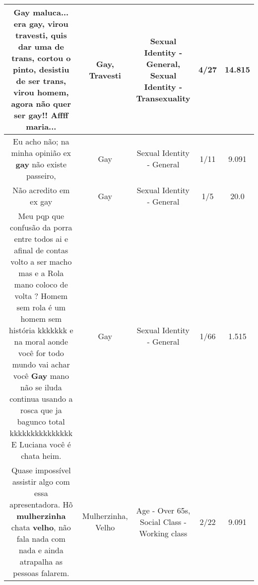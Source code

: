 \documentclass[11pt]{article}
\newlength\mylength
\begin{document}
\begin{center}
\begin{longtable}{|C{.65\mylength}|C{.30\mylength}|C{.12\mylength}|C{.12\mylength}|C{.12\mylength}|}
  \small Gay maluca... era \textbf{gay}, virou \textbf{travesti}, quis dar uma de trans, cortou o pinto, desistiu de ser trans, virou homem, agora não quer ser \textbf{gay}!! Affff maria...\normalsize   & Gay, Travesti & Sexual Identity - General, Sexual Identity - Transexuality & 4/27 & 14.815 \\  \hline
  \small Eu acho não; na minha opinião ex \textbf{gay} não existe passeiro,\normalsize   & Gay & Sexual Identity - General & 1/11 & 9.091 \\  \hline
  \small Não acredito em ex gay\normalsize   & Gay & Sexual Identity - General & 1/5 & 20.0 \\  \hline
  \small Meu pqp que confusão da porra entre todos ai e afinal de contas volto a ser macho mas e a Rola mano coloco de volta ? Homem sem rola é um homem sem história kkkkkkk e na moral aonde você for todo mundo vai achar você \textbf{Gay} mano não se iluda continua usando a rosca que ja bagunco total kkkkkkkkkkkkkkk E Luciana você é chata heim.\normalsize   & Gay & Sexual Identity - General & 1/66 & 1.515 \\  \hline
  \small Quase impossível assistir algo com essa apresentadora. Hõ \textbf{mulherzinha} chata \textbf{velho}, não fala nada com nada e ainda atrapalha as pessoas falarem.\normalsize   & Mulherzinha, Velho & Age - Over 65s, Social Class - Working class & 2/22 & 9.091 \\  \hline

\end{longtable}
\end{center}
\end{document}
